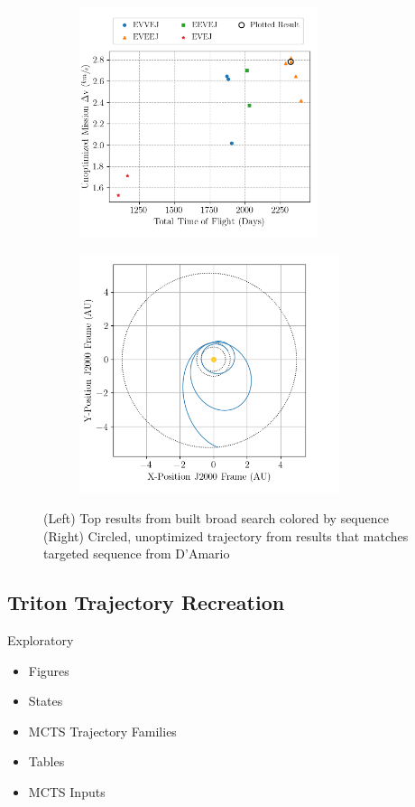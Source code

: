 \documentclass[letterpaper, preprint, paper,11pt]{AAS}	%
\begin{document}
\begin{figure}[htb]
    \begin{subfigure}
        \centering\includegraphics[width=2.75in]{./fig/galileoResults.png}
    \end{subfigure}
    \begin{subfigure}
        \centering\includegraphics[width=3in]{./fig/galileoMCTS.png}
    \end{subfigure}
    \caption{(Left) Top results from built broad search colored by sequence\hspace{1em} (Right) Circled, unoptimized trajectory from results that matches targeted sequence from D'Amario \cite{DAmario1992}}
    \label{fig:clipResults}
\end{figure}



\subsection{Triton Trajectory Recreation}
Exploratory

\begin{itemize}
    \item Figures
        \item States 
        \item MCTS Trajectory Families
    \item Tables
        \item MCTS Inputs
\end{itemize}
\end{document}
